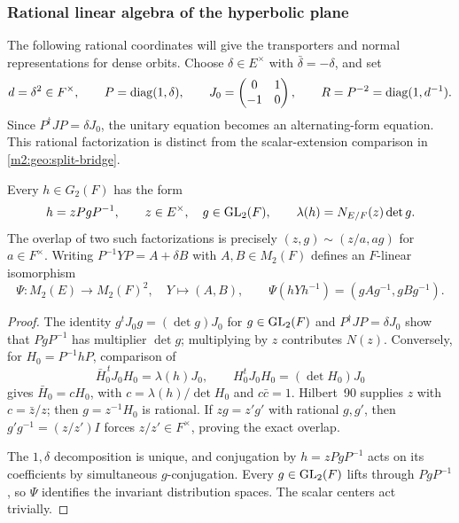 \subsubsection{Rational linear algebra of the hyperbolic plane}
\label{m2:red:unitary-pair}

The following rational coordinates will give the transporters and
normal representations for dense orbits.
Choose $\delta\in E^\times$ with $\bar\delta=-\delta$, and set
\[
 d=\delta^2\in F^\times,\qquad P=\operatorname{diag}(1,\delta),\qquad
 J_0=\begin{pmatrix}0&1\\-1&0\end{pmatrix},\qquad
 R=P^{-2}=\operatorname{diag}(1,d^{-1}).
\]
Since $P^\dagger JP=\delta J_0$, the unitary equation becomes an
alternating-form equation. This rational factorization is distinct from
the scalar-extension comparison in \cref{m2:geo:split-bridge}.

\begin{lemma}\label{m2:simconj:factorization}
Every $h\in G_2(F)$ has the form
\begin{equation}\label{m2:simconj:factor}
 h=zPgP^{-1},\qquad z\in E^\times,\quad g\in\operatorname{GL}_2(F),
 \qquad \lambda(h)=N_{E/F}(z)\det g.
\end{equation}
The overlap of two such factorizations is precisely
$(z,g)\sim(z/a,ag)$ for $a\in F^\times$.
Writing $P^{-1}YP=A+\delta B$ with $A,B\in M_2(F)$ defines
an $F$-linear isomorphism
\begin{equation}\label{m2:simconj:Psi}
 \Psi:M_2(E)\longrightarrow M_2(F)^2,
 \quad Y\longmapsto(A,B),\qquad
 \Psi(hYh^{-1})=(gAg^{-1},gBg^{-1}).
\end{equation}
\end{lemma}

\begin{proof}
The identity $g^tJ_0g=(\det g)J_0$ for $g\in\operatorname{GL}_2(F)$ and
$P^\dagger JP=\delta J_0$ show that $PgP^{-1}$ has multiplier
$\det g$; multiplying by $z$ contributes $N(z)$.
Conversely, for $H_0=P^{-1}hP$, comparison of
\[
 \bar H_0^{\,t}J_0H_0=\lambda(h)J_0,
 \qquad H_0^tJ_0H_0=(\det H_0)J_0
\]
gives $\bar H_0=cH_0$, with $c=\lambda(h)/\det H_0$ and
$c\bar c=1$. Hilbert~90 supplies $z$ with $c=\bar z/z$;
then $g=z^{-1}H_0$ is rational. If $zg=z'g'$ with rational
$g,g'$, then $g'g^{-1}=(z/z')I$ forces $z/z'\in F^\times$,
proving the exact overlap.

The $1,\delta$ decomposition is unique, and conjugation by
$h=zPgP^{-1}$ acts on its coefficients by simultaneous $g$-conjugation.
Every $g\in\operatorname{GL}_2(F)$ lifts through $PgP^{-1}$, so $\Psi$
identifies the invariant distribution spaces. The scalar centers
act trivially.
\end{proof}

